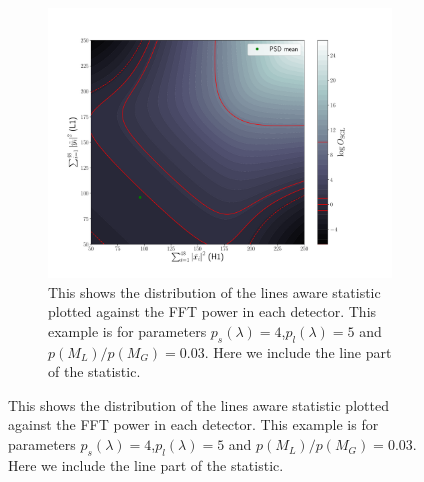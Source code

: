 \begin{figure}
\begin{subfigure}[h]{\linewidth}
\begin{minipage}{0.65\linewidth}
\includegraphics[width=1.\columnwidth]{C3_soap/lookup_linesmall.pdf}
\end{minipage}\hfill
\begin{minipage}{0.35\linewidth}
\caption{This shows the distribution of the lines aware statistic plotted against the \ac{FFT} power in each detector. This example is for parameters $p_s(\lambda) = 4$,$p_l(\lambda) = 5$ and $p(M_L)/p(M_G) = 0.03$. Here we include the line part of the statistic.}
\label{viterbi:plot:data}
\end{minipage}
\end{subfigure}


\end{figure}
